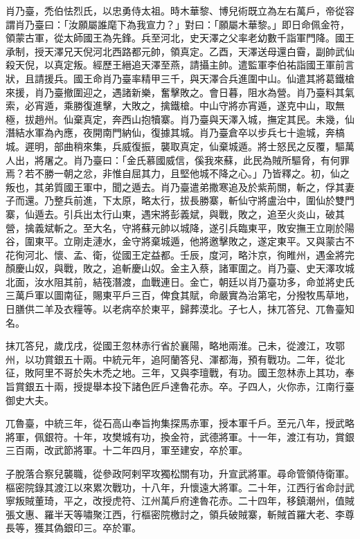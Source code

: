 \begin{pinyinscope}
 肖乃臺，禿伯怯烈氏，以忠勇侍太祖。時木華黎、博兒術既立為左右萬戶，帝從容謂肖乃臺曰：「汝願屬誰麾下為我宣力？」對曰：「願屬木華黎。」即日命佩金符，領蒙古軍，從太師國王為先鋒。兵至河北，史天澤之父率老幼數千詣軍門降。國王承制，授天澤兄天倪河北西路都元帥，領真定。乙酉，天澤送母還白霫，副帥武仙殺天倪，以真定叛。經歷王縉追天澤至燕，請攝主帥。遣監軍李伯祐詣國王軍前言狀，且請援兵。國王命肖乃臺率精甲三千，與天澤合兵進圍中山。仙遣其將葛鐵槍來援，肖乃臺撤圍迎之，遇諸新樂，奮擊敗之。會日暮，阻水為營。肖乃臺料其氣索，必宵遁，乘勝復進擊，大敗之，擒鐵槍。中山守將亦宵遁，遂克中山，取無極，拔趙州。仙棄真定，奔西山抱犢寨。肖乃臺與天澤入城，撫定其民。未幾，仙潛結水軍為內應，夜開南門納仙，復據其城。肖乃臺倉卒以步兵七十逾城，奔槁城。遲明，部曲稍來集，兵威復振，襲取真定，仙棄城遁。將士怒民之反覆，驅萬人出，將屠之。肖乃臺曰：「金氏慕國威信，傒我來蘇，此民為賊所驅脅，有何罪焉？若不勝一朝之忿，非惟自屈其力，且堅他城不降之心。」乃皆釋之。初，仙之叛也，其弟質國王軍中，聞之遁去。肖乃臺遣弟撒寒追及於紫荊關，斬之，俘其妻子而還。乃整兵前進，下太原，略太行，拔長勝寨，斬仙守將盧治中，圍仙於雙門寨，仙遁去。引兵出太行山東，遇宋將彭義斌，與戰，敗之，追至火炎山，破其營，擒義斌斬之。至大名，守將蘇元帥以城降，遂引兵臨東平，敗安撫王立剛於陽谷，圍東平。立剛走漣水，金守將棄城遁，他將邀擊敗之，遂定東平。又與蒙古不花徇河北、懷、孟、衛，從國王定益都。壬辰，度河，略汴京，徇睢州，遇金將完顏慶山奴，與戰，敗之，追斬慶山奴。金主入蔡，諸軍圍之。肖乃臺、史天澤攻城北面，汝水阻其前，結筏潛渡，血戰連日。金亡，朝廷以肖乃臺功多，命並將史氏三萬戶軍以圖南征，賜東平戶三百，俾食其賦，命嚴實為治第宅，分撥牧馬草地，日膳供二羊及衣糧等。以老病卒於東平，歸葬漠北。子七人，抹兀答兒、兀魯臺知名。



 抹兀答兒，歲戊戌，從國王忽林赤行省於襄陽，略地兩淮。己未，從渡江，攻鄂州，以功賞銀五十兩。中統元年，追阿蘭答兒、渾都海，預有戰功。二年，從北征，敗阿里不哥於失木禿之地。三年，又與李璮戰，有功。國王忽林赤上其功，奉旨賞銀五十兩，授提舉本投下諸色匠戶達魯花赤。卒。子四人，火你赤，江南行臺御史大夫。



 兀魯臺，中統三年，從石高山奉旨拘集探馬赤軍，授本軍千戶。至元八年，授武略將軍，佩銀符。十年，攻樊城有功，換金符，武德將軍。十一年，渡江有功，賞銀三百兩，改武節將軍。十二年四月，軍至建安，卒於軍。



 子脫落合察兒襲職，從參政阿剌罕攻獨松關有功，升宣武將軍。尋命管領侍衛軍。樞密院錄其渡江以來累次戰功，十八年，升懷遠大將軍。二十年，江西行省命討武寧叛賊董琦，平之，改授虎符、江州萬戶府達魯花赤。二十四年，移鎮潮州，值賊張文惠、羅半天等嘯聚江西，行樞密院檄討之，領兵破賊寨，斬賊首羅大老、李尊長等，獲其偽銀印三。卒於軍。




\end{pinyinscope}
